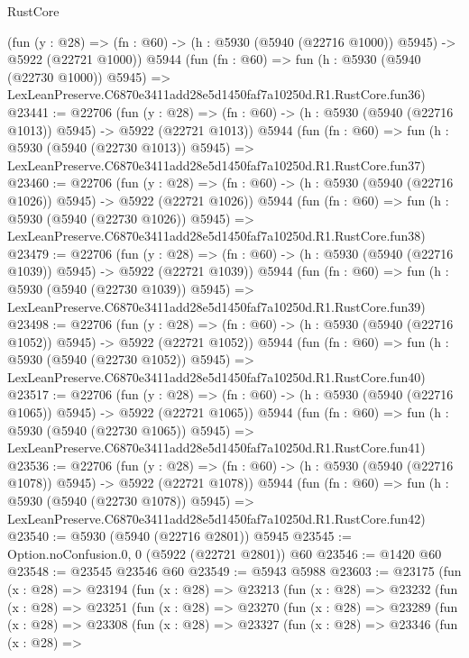 \begin{lexlean}{RustCore}
\begin{coremodule}
    (fun (y : @28) =>
    (fn : @60) -> (h : @5930 (@5940 (@22716 @1000)) @5945) -> @5922 (@22721 @1000))
    @5944
    (fun (fn : @60) =>
    fun (h : @5930 (@5940 (@22730 @1000)) @5945) =>
    LexLeanPreserve.C6870e3411add28e5d1450faf7a10250d.R1.RustCore.fun36)
@23441 := @22706
    (fun (y : @28) =>
    (fn : @60) -> (h : @5930 (@5940 (@22716 @1013)) @5945) -> @5922 (@22721 @1013))
    @5944
    (fun (fn : @60) =>
    fun (h : @5930 (@5940 (@22730 @1013)) @5945) =>
    LexLeanPreserve.C6870e3411add28e5d1450faf7a10250d.R1.RustCore.fun37)
@23460 := @22706
    (fun (y : @28) =>
    (fn : @60) -> (h : @5930 (@5940 (@22716 @1026)) @5945) -> @5922 (@22721 @1026))
    @5944
    (fun (fn : @60) =>
    fun (h : @5930 (@5940 (@22730 @1026)) @5945) =>
    LexLeanPreserve.C6870e3411add28e5d1450faf7a10250d.R1.RustCore.fun38)
@23479 := @22706
    (fun (y : @28) =>
    (fn : @60) -> (h : @5930 (@5940 (@22716 @1039)) @5945) -> @5922 (@22721 @1039))
    @5944
    (fun (fn : @60) =>
    fun (h : @5930 (@5940 (@22730 @1039)) @5945) =>
    LexLeanPreserve.C6870e3411add28e5d1450faf7a10250d.R1.RustCore.fun39)
@23498 := @22706
    (fun (y : @28) =>
    (fn : @60) -> (h : @5930 (@5940 (@22716 @1052)) @5945) -> @5922 (@22721 @1052))
    @5944
    (fun (fn : @60) =>
    fun (h : @5930 (@5940 (@22730 @1052)) @5945) =>
    LexLeanPreserve.C6870e3411add28e5d1450faf7a10250d.R1.RustCore.fun40)
@23517 := @22706
    (fun (y : @28) =>
    (fn : @60) -> (h : @5930 (@5940 (@22716 @1065)) @5945) -> @5922 (@22721 @1065))
    @5944
    (fun (fn : @60) =>
    fun (h : @5930 (@5940 (@22730 @1065)) @5945) =>
    LexLeanPreserve.C6870e3411add28e5d1450faf7a10250d.R1.RustCore.fun41)
@23536 := @22706
    (fun (y : @28) =>
    (fn : @60) -> (h : @5930 (@5940 (@22716 @1078)) @5945) -> @5922 (@22721 @1078))
    @5944
    (fun (fn : @60) =>
    fun (h : @5930 (@5940 (@22730 @1078)) @5945) =>
    LexLeanPreserve.C6870e3411add28e5d1450faf7a10250d.R1.RustCore.fun42)
@23540 := @5930 (@5940 (@22716 @2801)) @5945
@23545 := Option.noConfusion.{0, 0} (@5922 (@22721 @2801)) @60
@23546 := @1420 @60
@23548 := @23545 @23546 @60
@23549 := @5943 @5988
@23603 := @23175
    (fun (x : @28) =>
    @23194
      (fun (x : @28) =>
      @23213
        (fun (x : @28) =>
        @23232
          (fun (x : @28) =>
          @23251
            (fun (x : @28) =>
            @23270
              (fun (x : @28) =>
              @23289
                (fun (x : @28) =>
                @23308
                  (fun (x : @28) =>
                  @23327
                    (fun (x : @28) =>
                    @23346
                      (fun (x : @28) =>

\end{coremodule}
\end{lexlean}
